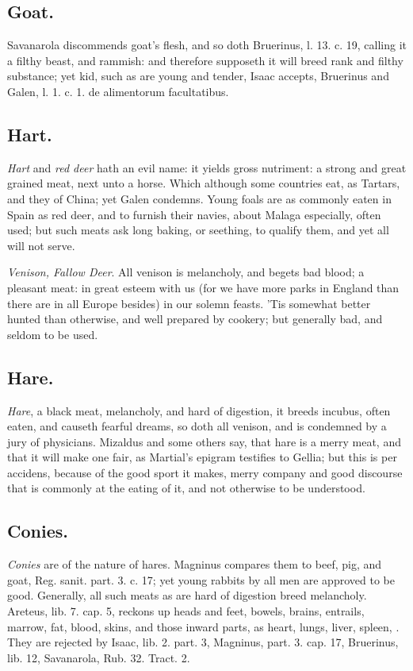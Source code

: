 {{\subsection{Goat.}
Savanarola discommends goat's flesh, and so doth
\textlatin{Bruerinus, l. 13. c. 19}, calling it a filthy beast, and rammish:
and therefore supposeth it will breed rank and filthy substance; yet
kid, such as are young and tender, Isaac accepts, Bruerinus and Galen,
\textlatin{l. 1. c. 1. de alimentorum facultatibus.}
\subsection{Hart.}
\emph{Hart} and \emph{red deer} hath an evil name: it yields gross
nutriment: a strong and great grained meat, next unto a horse. Which
although some countries eat, as Tartars, and they of China; yet 
Galen condemns. Young foals are as commonly eaten in Spain as red deer,
and to furnish their navies, about Malaga especially, often used; but
such meats ask long baking, or seething, to qualify them, and yet all
will not serve.

\emph{Venison, Fallow Deer}. All venison is melancholy, and begets bad blood;
a pleasant meat: in great esteem with us (for we have more parks in
England than there are in all Europe besides) in our solemn feasts.
'Tis somewhat better hunted than otherwise, and well prepared by
cookery; but generally bad, and seldom to be used.
\subsection{Hare.}
\emph{Hare}, a black meat, melancholy, and hard of digestion, it
breeds incubus, often eaten, and causeth fearful dreams, so doth all
venison, and is condemned by a jury of physicians. Mizaldus and some
others say, that hare is a merry meat, and that it will make one fair,
as Martial's epigram testifies to Gellia; but this is per accidens,
because of the good sport it makes, merry company and good discourse
that is commonly at the eating of it, and not otherwise to be
understood.

\subsection{Conies.}
\emph{Conies} are of the nature of hares. Magninus compares
them to beef, pig, and goat, Reg. sanit. part. 3. c. 17; yet young
rabbits by all men are approved to be good.
Generally, all such meats as are hard of digestion breed melancholy.
Areteus, lib. 7. cap. 5, reckons up heads and feet, bowels,
brains, entrails, marrow, fat, blood, skins, and those inward parts, as
heart, lungs, liver, spleen, \etc{}. They are rejected by Isaac, lib. 2.
part. 3, Magninus, part. 3. cap. 17, Bruerinus, lib. 12, Savanarola,
Rub. 32. Tract. 2.

}}

